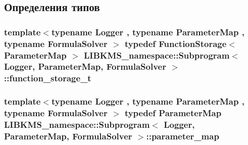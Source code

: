 \subsection{Определения типов}
\hypertarget{classLIBKMS__namespace_1_1Subprogram_a6233a24c21954444f64217e7af397349}{
\subsubsection[{function\-\_\-storage\-\_\-t}]{\setlength{\rightskip}{0pt plus 5cm}template$<$typename Logger , typename Parameter\-Map , typename Formula\-Solver $>$ typedef {\bf Function\-Storage}$<$ Parameter\-Map $>$ {\bf L\-I\-B\-K\-M\-S\-\_\-namespace\-::\-Subprogram}$<$ Logger, Parameter\-Map, Formula\-Solver $>$\-::{\bf function\-\_\-storage\-\_\-t}}}\label{classLIBKMS__namespace_1_1Subprogram_a6233a24c21954444f64217e7af397349}
\hypertarget{classLIBKMS__namespace_1_1Subprogram_a2ee2b32579888fcf68d85338b37b505c}{
\subsubsection[{parameter\-\_\-map}]{\setlength{\rightskip}{0pt plus 5cm}template$<$typename Logger , typename Parameter\-Map , typename Formula\-Solver $>$ typedef Parameter\-Map {\bf L\-I\-B\-K\-M\-S\-\_\-namespace\-::\-Subprogram}$<$ Logger, Parameter\-Map, Formula\-Solver $>$\-::{\bf parameter\-\_\-map}}}\label{classLIBKMS__namespace_1_1Subprogram_a2ee2b32579888fcf68d85338b37b505c}


